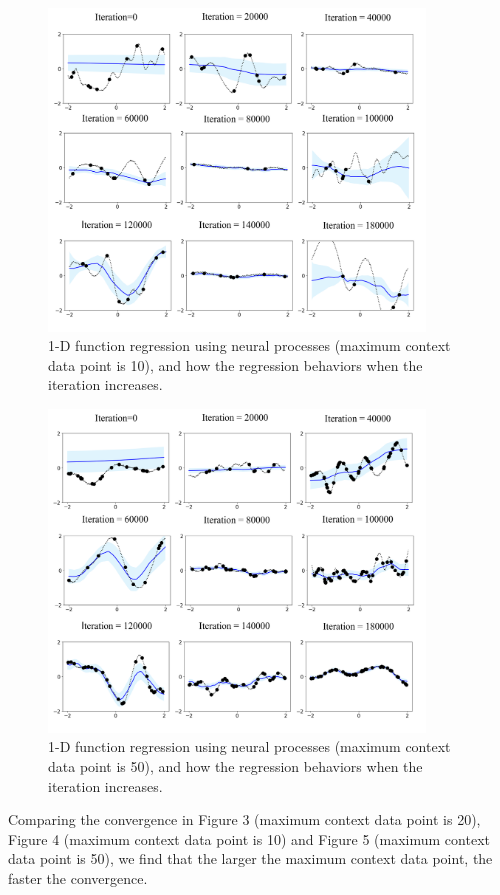 \documentclass{article}
\begin{document}
\begin{figure}[h!]
  \centering
  \includegraphics[width = 10cm]{NPS_1D_regression_cd10.png}
  \caption{1-D function regression using neural processes (maximum context data point is 10), and how the regression behaviors when the iteration increases.}
\end{figure}

\begin{figure}[h!]
  \centering
  \includegraphics[width = 10cm]{NPS_1D_regression_cd50.png}
  \caption{1-D function regression using neural processes (maximum context data point is 50), and how the regression behaviors when the iteration increases.}
\end{figure}

Comparing the convergence in Figure 3 (maximum context data point is 20), Figure 4 (maximum context data point is 10) and Figure 5 (maximum context data point is 50), we find that the larger the maximum context data point, the faster the convergence.
\end{document}
